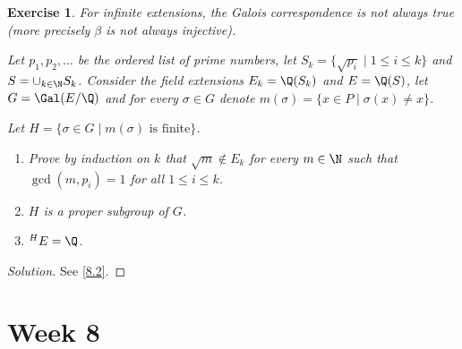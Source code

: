 \documentclass[a4paper,10pt,reqno]{amsart}
\newtheorem{ex}{Exercise}[section]
\newenvironment{sol}
  {\renewcommand\qedsymbol{$\blacksquare$}\begin{proof}[Solution]}
  {\end{proof}}
\begin{document}
\begin{ex}
\label{7.5}
For infinite extensions, the Galois correspondence is not always true (more precisely $\beta$ is not always injective).

Let $p_1,p_2,\dots$ be the ordered list of prime numbers, let
$S_k=\{\sqrt{p_i}\mid 1\leq i\leq k\}$ and 
$S=\cup_{k\in\N} S_k$.
Consider the field 
extensions $E_k=\Q(S_k)$ 
and $E=\Q(S)$,
let $G=\Gal(E/\Q)$ and for every $\sigma\in G$ 
denote $m(\sigma)=\{x\in P\mid \sigma(x)\neq x\}$.

Let $H=\{\sigma \in G\mid m(\sigma)\text{ is finite}\}$.
\begin{enumerate}[label=(\roman*)]
        \item Prove by induction on $k$ that 
        $\sqrt{m}\notin E_k$
        for every $m\in \N$ such that $\gcd(m,p_i)=1$ for all $1\leq i\leq k$.
        \item $H$ is a proper subgroup of $G$.
        \item ${}^HE=\Q$.
    \end{enumerate}
\end{ex}
\begin{sol}
    See \cref{8.2}.
\end{sol}

\newpage
\section{Week 8}
\end{document}
